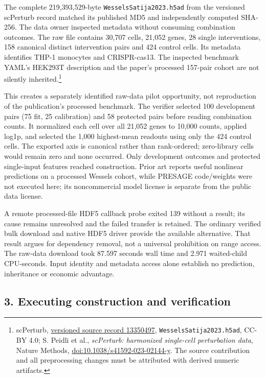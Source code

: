 \documentclass[
  10pt,
]{article}
\begin{document}
The complete 219,393,529-byte \texttt{WesselsSatija2023.h5ad} from the
versioned scPerturb record matched its published MD5 and independently
computed SHA-256. The data owner inspected metadata without consuming
combination outcomes. The raw file contains 30,707 cells, 21,052 genes,
28 single interventions, 158 canonical distinct intervention pairs and
424 control cells. Its metadata identifies THP-1 monocytes and
CRISPR-cas13. The inspected benchmark YAML's HEK293T description and the
paper's processed 157-pair cohort are not silently inherited.\footnote{scPerturb,
  \href{https://zenodo.org/records/13350497}{versioned source record
  13350497}, \texttt{WesselsSatija2023.h5ad}, CC-BY 4.0; S. Peidli et
  al., \emph{scPerturb: harmonized single-cell perturbation data},
  Nature Methods,
  \href{https://doi.org/10.1038/s41592-023-02144-y}{doi:10.1038/s41592-023-02144-y}.
  The source contribution and all preprocessing changes must be
  attributed with derived numeric artifacts.}

This creates a separately identified raw-data pilot opportunity, not
reproduction of the publication's processed benchmark. The verifier
selected 100 development pairs (75 fit, 25 calibration) and 58 protected
pairs before reading combination counts. It normalized each cell over
all 21,052 genes to 10,000 counts, applied log1p, and selected the 1,000
highest-mean readouts using only the 424 control cells. The exported
axis is canonical rather than rank-ordered; zero-library cells would
remain zero and none occurred. Only development outcomes and protected
single-input features reached construction. Prior art reports useful
nonlinear predictions on a processed Wessels cohort, while PRESAGE
code/weights were not executed here; its noncommercial model license is
separate from the public data license.

A remote processed-file HDF5 callback probe exited 139 without a result;
its cause remains unresolved and the failed transfer is retained. The
ordinary verified bulk download and native HDF5 driver provide the
available alternative. That result argues for dependency removal, not a
universal prohibition on range access. The raw-data download took 87.597
seconds wall time and 2.971 waited-child CPU-seconds. Input identity and
metadata access alone establish no prediction, inheritance or economic
advantage.

\hypertarget{executing-construction-and-verification}{%
\subsection{3. Executing construction and
verification}\label{executing-construction-and-verification}}
\end{document}
